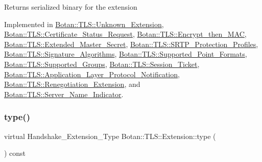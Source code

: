 \begin{DoxyReturn}{Returns}
serialized binary for the extension 
\end{DoxyReturn}


Implemented in \hyperlink{class_botan_1_1_t_l_s_1_1_unknown___extension_a1a706433e22a0b2bb3ab044fadd4f5a1}{Botan\+::\+T\+L\+S\+::\+Unknown\+\_\+\+Extension}, \hyperlink{class_botan_1_1_t_l_s_1_1_certificate___status___request_a912d1c631e0a38a80df00c8f073cdc2a}{Botan\+::\+T\+L\+S\+::\+Certificate\+\_\+\+Status\+\_\+\+Request}, \hyperlink{class_botan_1_1_t_l_s_1_1_encrypt__then___m_a_c_a1d58c33517e89c8e0daa7327bd4783ba}{Botan\+::\+T\+L\+S\+::\+Encrypt\+\_\+then\+\_\+\+M\+AC}, \hyperlink{class_botan_1_1_t_l_s_1_1_extended___master___secret_a5119fdc525bd8285fbd32ab6b7aa6daa}{Botan\+::\+T\+L\+S\+::\+Extended\+\_\+\+Master\+\_\+\+Secret}, \hyperlink{class_botan_1_1_t_l_s_1_1_s_r_t_p___protection___profiles_a095ee67aaf18e75768f6fcca0fa16ac6}{Botan\+::\+T\+L\+S\+::\+S\+R\+T\+P\+\_\+\+Protection\+\_\+\+Profiles}, \hyperlink{class_botan_1_1_t_l_s_1_1_signature___algorithms_aa4363eab527673a1474a7e048e0ad616}{Botan\+::\+T\+L\+S\+::\+Signature\+\_\+\+Algorithms}, \hyperlink{class_botan_1_1_t_l_s_1_1_supported___point___formats_aa54041e3a08a83be4aeffa4b105a282c}{Botan\+::\+T\+L\+S\+::\+Supported\+\_\+\+Point\+\_\+\+Formats}, \hyperlink{class_botan_1_1_t_l_s_1_1_supported___groups_ad88fb72f307017125cca018982800d76}{Botan\+::\+T\+L\+S\+::\+Supported\+\_\+\+Groups}, \hyperlink{class_botan_1_1_t_l_s_1_1_session___ticket_a446a320f05bfc710740defcd5ac0ca58}{Botan\+::\+T\+L\+S\+::\+Session\+\_\+\+Ticket}, \hyperlink{class_botan_1_1_t_l_s_1_1_application___layer___protocol___notification_a228264ad294e0569398e3e2575bc1e39}{Botan\+::\+T\+L\+S\+::\+Application\+\_\+\+Layer\+\_\+\+Protocol\+\_\+\+Notification}, \hyperlink{class_botan_1_1_t_l_s_1_1_renegotiation___extension_a711f6f2ba21e408a00d81fe1bc98751b}{Botan\+::\+T\+L\+S\+::\+Renegotiation\+\_\+\+Extension}, and \hyperlink{class_botan_1_1_t_l_s_1_1_server___name___indicator_ad45954f11df924771ad17662637bfc3c}{Botan\+::\+T\+L\+S\+::\+Server\+\_\+\+Name\+\_\+\+Indicator}.

\mbox{\label{class_botan_1_1_t_l_s_1_1_extension_ac8819b312ce604453225e7b4f7c373ec}} 
\subsubsection{\texorpdfstring{type()}{type()}}
{\footnotesize\ttfamily virtual Handshake\+\_\+\+Extension\+\_\+\+Type Botan\+::\+T\+L\+S\+::\+Extension\+::type (\begin{DoxyParamCaption}{ }\end{DoxyParamCaption}) const\hspace{0.3cm}{\ttfamily [pure virtual]}}

